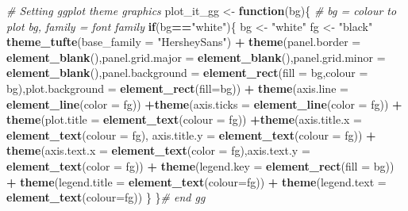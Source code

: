 \documentclass[10,portrait]{article}
\newenvironment{Shaded}{\begin{snugshade}}{\end{snugshade}}
\newcommand{\KeywordTok}[1]{\textcolor[rgb]{0.13,0.29,0.53}{\textbf{#1}}}
\newcommand{\DataTypeTok}[1]{\textcolor[rgb]{0.13,0.29,0.53}{#1}}
\newcommand{\StringTok}[1]{\textcolor[rgb]{0.31,0.60,0.02}{#1}}
\newcommand{\CommentTok}[1]{\textcolor[rgb]{0.56,0.35,0.01}{\textit{#1}}}
\newcommand{\ControlFlowTok}[1]{\textcolor[rgb]{0.13,0.29,0.53}{\textbf{#1}}}
\newcommand{\OperatorTok}[1]{\textcolor[rgb]{0.81,0.36,0.00}{\textbf{#1}}}
\newcommand{\NormalTok}[1]{#1}
\begin{document}
\begin{Shaded}
\begin{Highlighting}[]
\CommentTok{# Setting ggplot theme graphics}
\NormalTok{plot_it_gg <-}\StringTok{ }\ControlFlowTok{function}\NormalTok{(bg)\{ }\CommentTok{# bg = colour to plot bg, family = font family}
  \ControlFlowTok{if}\NormalTok{(bg}\OperatorTok{==}\StringTok{"white"}\NormalTok{)\{}
\NormalTok{    bg <-}\StringTok{ "white"}
\NormalTok{    fg <-}\StringTok{ "black"}
  \KeywordTok{theme_tufte}\NormalTok{(}\DataTypeTok{base_family =} \StringTok{"HersheySans"}\NormalTok{) }\OperatorTok{+}
\StringTok{    }\KeywordTok{theme}\NormalTok{(}\DataTypeTok{panel.border =} \KeywordTok{element_blank}\NormalTok{(),}\DataTypeTok{panel.grid.major =} \KeywordTok{element_blank}\NormalTok{(),}\DataTypeTok{panel.grid.minor =} \KeywordTok{element_blank}\NormalTok{(),}\DataTypeTok{panel.background =} \KeywordTok{element_rect}\NormalTok{(}\DataTypeTok{fill =}\NormalTok{ bg,}\DataTypeTok{colour =}\NormalTok{ bg),}\DataTypeTok{plot.background =} \KeywordTok{element_rect}\NormalTok{(}\DataTypeTok{fill=}\NormalTok{bg)) }\OperatorTok{+}
\StringTok{    }\KeywordTok{theme}\NormalTok{(}\DataTypeTok{axis.line =} \KeywordTok{element_line}\NormalTok{(}\DataTypeTok{color =}\NormalTok{ fg)) }\OperatorTok{+}\KeywordTok{theme}\NormalTok{(}\DataTypeTok{axis.ticks =} \KeywordTok{element_line}\NormalTok{(}\DataTypeTok{color =}\NormalTok{ fg)) }\OperatorTok{+}\StringTok{ }\KeywordTok{theme}\NormalTok{(}\DataTypeTok{plot.title =} \KeywordTok{element_text}\NormalTok{(}\DataTypeTok{colour =}\NormalTok{ fg)) }\OperatorTok{+}\KeywordTok{theme}\NormalTok{(}\DataTypeTok{axis.title.x =} \KeywordTok{element_text}\NormalTok{(}\DataTypeTok{colour =}\NormalTok{ fg), }\DataTypeTok{axis.title.y =} \KeywordTok{element_text}\NormalTok{(}\DataTypeTok{colour =}\NormalTok{ fg)) }\OperatorTok{+}\StringTok{ }\KeywordTok{theme}\NormalTok{(}\DataTypeTok{axis.text.x =} \KeywordTok{element_text}\NormalTok{(}\DataTypeTok{color =}\NormalTok{ fg),}\DataTypeTok{axis.text.y =} \KeywordTok{element_text}\NormalTok{(}\DataTypeTok{color =}\NormalTok{ fg)) }\OperatorTok{+}\StringTok{ }\KeywordTok{theme}\NormalTok{(}\DataTypeTok{legend.key =} \KeywordTok{element_rect}\NormalTok{(}\DataTypeTok{fill =}\NormalTok{ bg)) }\OperatorTok{+}\StringTok{ }\KeywordTok{theme}\NormalTok{(}\DataTypeTok{legend.title =} \KeywordTok{element_text}\NormalTok{(}\DataTypeTok{colour=}\NormalTok{fg)) }\OperatorTok{+}\StringTok{ }\KeywordTok{theme}\NormalTok{(}\DataTypeTok{legend.text =} \KeywordTok{element_text}\NormalTok{(}\DataTypeTok{colour=}\NormalTok{fg))}
\NormalTok{\}}
\NormalTok{  \}}\CommentTok{# end gg}


\end{Highlighting}
\end{Shaded}
\end{document}
